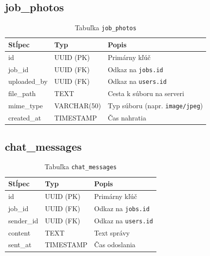 \subsection{job\_photos}
\begin{table}[H]
  \centering
  \begin{tabularx}{\textwidth}{llX}
    \toprule
    \textbf{Stĺpec} & \textbf{Typ} & \textbf{Popis} \\
    \midrule
    id          & UUID (PK)  & Primárny kľúč \\
    job\_id     & UUID (FK)  & Odkaz na \texttt{jobs.id} \\
    uploaded\_by & UUID (FK) & Odkaz na \texttt{users.id} \\
    file\_path  & TEXT       & Cesta k súboru na serveri \\
    mime\_type  & VARCHAR(50) & Typ súboru (napr. \texttt{image/jpeg}) \\
    created\_at & TIMESTAMP  & Čas nahratia \\
    \bottomrule
  \end{tabularx}
  \caption{Tabuľka \texttt{job\_photos}}
\end{table}

\subsection{chat\_messages}
\begin{table}[H]
  \centering
  \begin{tabularx}{\textwidth}{llX}
    \toprule
    \textbf{Stĺpec} & \textbf{Typ} & \textbf{Popis} \\
    \midrule
    id         & UUID (PK)  & Primárny kľúč \\
    job\_id    & UUID (FK)  & Odkaz na \texttt{jobs.id} \\
    sender\_id & UUID (FK)  & Odkaz na \texttt{users.id} \\
    content    & TEXT       & Text správy \\
    sent\_at   & TIMESTAMP  & Čas odoslania \\
    \bottomrule
  \end{tabularx}
  \caption{Tabuľka \texttt{chat\_messages}}
\end{table}

